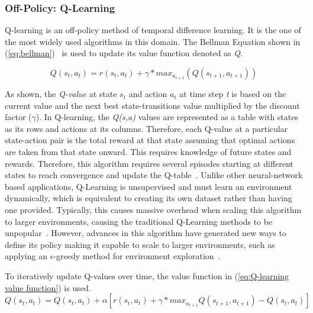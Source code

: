 \documentclass[12pt,american]{report}
\begin{document}
        
\subsubsection{Off-Policy: Q-Learning}
        Q-learning is an off-policy method of temporal difference learning. It is the one of the most widely used algorithms in this domain. The Bellman Equation shown in (\ref{eq:bellman})~\cite{matiisen_2015} is used to update its value function denoted as \textit{Q}.
        
        \begin{equation}
            \label{eq:bellman}
            Q(s_{t},a_{t}) = r(s_{t},a_{t}) + \gamma*max_{a_{t+1} }(Q(s_{t+1},a_{t+1}))
        \end{equation}
        
        As shown, the \textit{Q-value} at state \textit{$s_t$} and action \textit{$a_t$} at time step \textit{t} is based on the current value and the next best state-transitions value multiplied by the discount factor ($\gamma$). In Q-learning, the \textit{Q(s,a)} values are represented as a table with states as its rows and actions at its columns.  Therefore, each Q-value at a particular state-action pair is the total reward at that state assuming that optimal actions are taken from that state onward.  This requires knowledge of future states and rewards.  Therefore, this algorithm requires several episodes starting at different states to reach convergence and update the Q-table~\cite{Watkins:1992}. Unlike other neural-network based applications, Q-Learning is unsupervised and must learn an environment dynamically, which is equivalent to creating its own dataset rather than having one provided. Typically, this causes massive overhead when scaling this algorithm to larger environments, causing the traditional Q-Learning methods to be unpopular~\cite{peng2015mobile}.  However, advances in this algorithm have generated new ways to define its policy making it capable to scale to larger environments, such as applying an $\epsilon$-greedy method for environment exploration~\cite{Greedy}. 

To iteratively update Q-values over time, the value function in (\ref{eq:Q-learning value function}) is used. 
        \begin{equation}
            \label{eq:Q-learning value function}
            Q(s_{t},a_{t}) = Q(s_{t},a_{t}) + \alpha[r(s_{t},a_{t}) + \gamma*max_{a_{t+1} }Q(s_{t+1},a_{t+1})-Q(s_{t},a_{t})]
        \end{equation}
        
\end{document}
